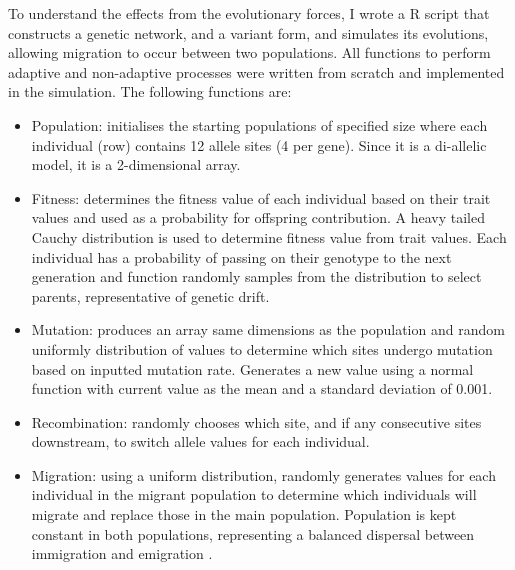 To understand the effects from the evolutionary forces, I wrote a R script that constructs a genetic network, and a variant form, and simulates its evolutions, allowing migration to occur between two populations. All functions to perform adaptive and non-adaptive processes were written from scratch and implemented in the simulation. The following functions are:
\begin{itemize}
    \item Population: initialises the starting populations of specified size where each individual (row) contains 12 allele sites (4 per gene). Since it is a di-allelic model, it is a 2-dimensional array.
    \item Fitness: determines the fitness value of each individual based on their trait values and used as a probability for offspring contribution. A heavy tailed Cauchy distribution is used to determine fitness value from trait values. Each individual has a probability of passing on their genotype to the next generation and function randomly samples from the distribution to select parents, representative of genetic drift.
    \item Mutation: produces an array same dimensions as the population and random uniformly distribution of values to determine which sites undergo mutation based on inputted mutation rate. Generates a new value using a normal function with current value as the mean and a standard deviation of 0.001.
    \item Recombination: randomly chooses which site, and if any consecutive sites downstream, to switch allele values for each individual.
    \item Migration: using a uniform distribution, randomly generates values for each individual in the migrant population to determine which individuals will migrate and replace those in the main population. Population is kept constant in both populations, representing a balanced dispersal between immigration and emigration \cite{rice2009evolution,w2004dispersal}.
\end{itemize}

